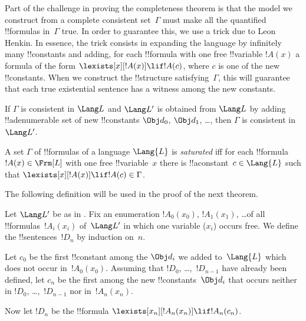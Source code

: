 

\begin{explain}
Part of the challenge in proving the completeness theorem is that the
model we construct from a complete consistent set~$\Gamma$ must make
all the quantified !!{formula}s in~$\Gamma$ true.  In order to
guarantee this, we use a trick due to Leon Henkin.  In essence, the
trick consists in expanding the language by infinitely many !!{constant}s
and adding, for each !!{formula} with one free !!{variable} $!A(x)$ a
formula of the form
$\lexists[x][!A(x)] \lif !A(c)$,
where $c$ is one of the new !!{constant}s.  When we construct the
!!{structure} satisfying~$\Gamma$, this will guarantee that each
true existential sentence has a witness
among the new constants.
\end{explain}

\begin{prop}
If $\Gamma$ is consistent in $\Lang L$ and $\Lang L'$ is obtained from
$\Lang L$ by adding !!a{denumerable} set of new !!{constant}s $\Obj d_0$,
$\Obj d_1$, \dots, then $\Gamma$ is consistent in~$\Lang L'$.
\end{prop}

\begin{defn}
A set $\Gamma$ of !!{formula}s of a language $\Lang {L}$ is
\emph{saturated} iff for each !!{formula}~$!A(x) \in \Frm[L]$ with one
free !!{variable}~$x$ there is !!a{constant}~$c \in \Lang{L}$ such
that
$\lexists[x][!A(x)] \lif !A(c) \in \Gamma$.
\end{defn}

The following definition will be used in the proof of the next theorem.

\begin{defn}
Let $\Lang L'$ be as in .  Fix an enumeration
$!A_0(x_0)$, $!A_1(x_1)$, \dots of all !!{formula}s~$!A_i(x_i)$
of~$\Lang L'$ in which one variable ($x_i$) occurs free.  We define
the !!{sentence}s~$!D_n$ by induction on~$n$.

Let $c_0$ be the first !!{constant} among the $\Obj d_i$ we added
to~$\Lang{L}$ which does not occur in~$!A_0(x_0)$.  Assuming that
$!D_0$, \dots,~$!D_{n-1}$ have already been defined, let $c_n$ be the
first among the new !!{constant}s~$\Obj d_i$ that occurs neither in
$!D_0$, \dots,~$!D_{n-1}$ nor in~$!A_n(x_n)$.

Now let $!D_{n}$ be the !!{formula} $\lexists[x_{n}][!A_{n}(x_{n})] \lif
  !A_{n}(c_{n})$.
\end{defn}

